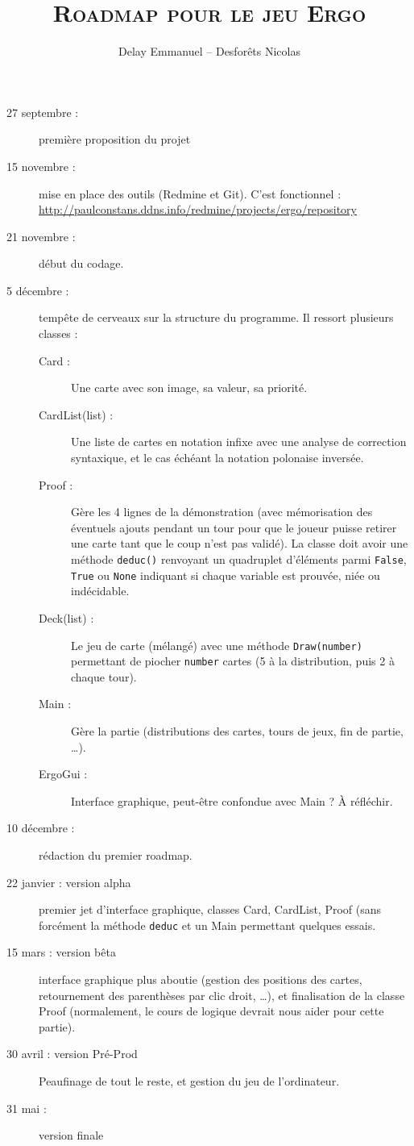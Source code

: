 \documentclass[12pt]{cours}
\title{\textbf{\textsc{Roadmap pour le jeu Ergo}}}
\author{Delay Emmanuel -- Desforêts Nicolas}
\begin{document}
\maketitle

\begin{description}
\item[27 septembre :] première proposition du projet
\item[15 novembre :] mise en place des outils (Redmine et Git). C'est fonctionnel : \url{http://paulconstans.ddns.info/redmine/projects/ergo/repository}
\item[21 novembre :] début du codage.
\item[5 décembre :] tempête de cerveaux sur la structure du programme. Il ressort plusieurs classes :

\begin{description}
\item[Card :] Une carte avec son image, sa valeur, sa priorité.
\item[CardList(list) :] Une liste de cartes en notation infixe avec une analyse de correction syntaxique, et le cas échéant la notation polonaise inversée.
\item[Proof : ] Gère les 4 lignes de la démonstration (avec mémorisation des éventuels ajouts pendant un tour pour que le joueur puisse retirer une carte tant que le coup n'est pas validé). La classe doit avoir une méthode \texttt{deduc()} renvoyant un quadruplet d'éléments parmi \texttt{False}, \texttt{True} ou \texttt{None} indiquant si chaque variable est prouvée, niée ou indécidable.
\item[Deck(list) :] Le jeu de carte (mélangé) avec une méthode \texttt{Draw(number)} permettant de piocher \texttt{number} cartes (5 à la distribution, puis 2 à chaque tour).
\item[Main :] Gère la partie (distributions des cartes, tours de jeux, fin de partie, \dots).
\item[ErgoGui :] Interface graphique, peut-être confondue avec Main ? À réfléchir.
\end{description}
\item[10 décembre :] rédaction du premier roadmap.
\item[22 janvier : version alpha]  premier jet d'interface graphique, classes Card, CardList, Proof (sans forcément la méthode \texttt{deduc} et un Main permettant quelques essais.
\item[15 mars : version bêta] interface graphique plus aboutie (gestion des positions des cartes, retournement des parenthèses par clic droit, \dots), et finalisation de la classe Proof (normalement, le cours de logique devrait nous aider pour cette partie).
\item[30 avril : version Pré-Prod] Peaufinage de tout le reste, et gestion du jeu de l'ordinateur.
\item[31 mai :] version finale
\end{description}
\end{document}
